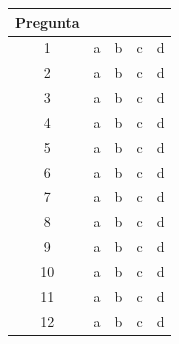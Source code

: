 \documentclass[11pt]{article}
\begin{document}
\begin{minipage}{2cm}
\begin{tabular}{|c||>{\tiny}c||>{\tiny}c||>{\tiny}c||>{\tiny}c|}
\hline
Pregunta&\multicolumn{4}{|c|}{Respuesta} \\
\hline\hline
 1& a& b &c &d\\ \hline
 2& a& b &c &d\\ \hline
 3& a& b &c &d\\ \hline
 4& a& b &c &d\\ \hline
 5& a& b &c &d\\ \hline
 6& a& b &c &d\\ \hline
 7& a& b &c &d\\ \hline
 8& a& b &c &d\\ \hline
 9& a& b &c &d\\ \hline
10& a& b &c &d\\ \hline
11& a& b &c &d\\ \hline
12& a& b &c &d\\ \hline
\end{tabular}
\end{minipage}
\end{document}
